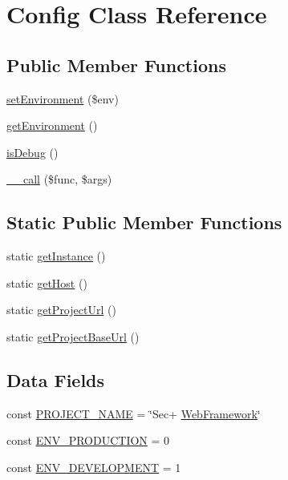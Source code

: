 \hypertarget{class_sec_plus_1_1_config}{
\section{Config Class Reference}
\label{class_sec_plus_1_1_config}
}
\subsection*{Public Member Functions}
\begin{DoxyCompactItemize}
\item 
\hyperlink{class_sec_plus_1_1_config_abacc22b77b423912f8bd5ab05432ff80}{setEnvironment} (\$env)
\item 
\hyperlink{class_sec_plus_1_1_config_a1a945689f9a90f9029d671ec32262d37}{getEnvironment} ()
\item 
\hyperlink{class_sec_plus_1_1_config_a017d21b4d0e1ee6f9cdd9d805793f076}{isDebug} ()
\item 
\hyperlink{class_sec_plus_1_1_config_addda52da3f818413b045c9dc45409b7c}{\_\-\_\-call} (\$func, \$args)
\end{DoxyCompactItemize}
\subsection*{Static Public Member Functions}
\begin{DoxyCompactItemize}
\item 
static \hyperlink{class_sec_plus_1_1_config_ac93fbec81f07e5d15f80db907e63dc10}{getInstance} ()
\item 
static \hyperlink{class_sec_plus_1_1_config_a224bbe52d89fa2b81245d9fa451e4294}{getHost} ()
\item 
static \hyperlink{class_sec_plus_1_1_config_aecfa0050ed3f04e0b3434f29ac3af88e}{getProjectUrl} ()
\item 
static \hyperlink{class_sec_plus_1_1_config_a92dca6d4e08b6f26d0c15d8df7516a68}{getProjectBaseUrl} ()
\end{DoxyCompactItemize}
\subsection*{Data Fields}
\begin{DoxyCompactItemize}
\item 
const \hyperlink{class_sec_plus_1_1_config_ae4ca0cededce7cacacca1c007b51ff29}{PROJECT\_\-NAME} = \char`\"{}Sec+ \hyperlink{class_sec_plus_1_1_web_framework}{WebFramework}\char`\"{}
\item 
const \hyperlink{class_sec_plus_1_1_config_a80cb73e4bb4dd2a7d04b7303faf15852}{ENV\_\-PRODUCTION} = 0
\item 
const \hyperlink{class_sec_plus_1_1_config_abe4546334d26d358d84c5c068023a59f}{ENV\_\-DEVELOPMENT} = 1
\end{DoxyCompactItemize}
